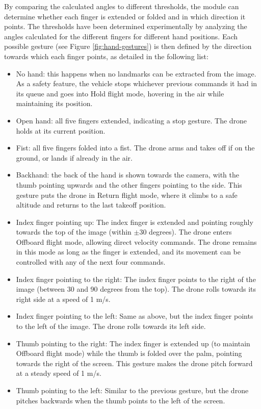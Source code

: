 By comparing the calculated angles to different thresholds, the module can determine whether each finger is extended or folded and in which direction it points. The thresholds have been determined experimentally by analyzing the angles calculated for the different fingers for different hand positions. Each possible gesture (see Figure \ref{fig:hand-gestures}) is then defined by the direction towards which each finger points, as detailed in the following list:
\begin{itemize}
    \item No hand: this happens when no landmarks can be extracted from the image. As a safety feature, the vehicle stops whichever previous commands it had in its queue and goes into Hold flight mode, hovering in the air while maintaining its position.
    \item Open hand: all five fingers extended, indicating a stop gesture. The drone holds at its current position.
    \item Fist: all five fingers folded into a fist. The drone arms and takes off if on the ground, or lands if already in the air.
    \item Backhand: the back of the hand is shown towards the camera, with the thumb pointing upwards and the other fingers pointing to the side. This gesture puts the drone in Return flight mode, where it climbs to a safe altitude and returns to the last takeoff position.
    \item Index finger pointing up: The index finger is extended and pointing roughly towards the top of the image (within $\pm$30 degrees). The drone enters Offboard flight mode, allowing direct velocity commands. The drone remains in this mode as long as the finger is extended, and its movement can be controlled with any of the next four commands.
    \item Index finger pointing to the right: The index finger points to the right of the image (between 30 and 90 degrees from the top). The drone rolls towards its right side at a speed of 1 m/s.
    \item Index finger pointing to the left: Same as above, but the index finger points to the left of the image. The drone rolls towards its left side.
    \item Thumb pointing to the right: The index finger is extended up (to maintain Offboard flight mode) while the thumb is folded over the palm, pointing towards the right of the screen. This gesture makes the drone pitch forward at a steady speed of 1 m/s.
    \item Thumb pointing to the left: Similar to the previous gesture, but the drone pitches backwards when the thumb points to the left of the screen.
\end{itemize}

